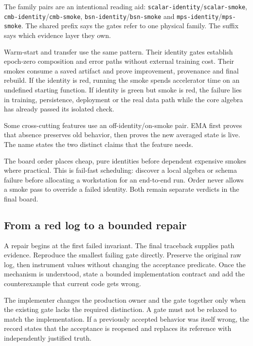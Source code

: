 \documentclass[10pt,aps,prd,twocolumn,nofootinbib]{revtex4-2}
\newcommand{\code}[1]{\texttt{#1}}
\begin{document}
The family pairs are an intentional reading aid:
\code{scalar-identity}/\code{scalar-smoke},
\code{cmb-identity}/\code{cmb-smoke},
\code{bsn-identity}/\code{bsn-smoke} and
\code{mps-identity}/\code{mps-smoke}.  The shared prefix says the gates refer
to one physical family.  The suffix says which evidence layer they own.

Warm-start and transfer use the same pattern.  Their identity gates establish
epoch-zero composition and error paths without external training cost.  Their
smokes consume a saved artifact and prove improvement, provenance and final
rebuild.  If the identity is red, running the smoke spends accelerator time on
an undefined starting function.  If identity is green but smoke is red, the
failure lies in training, persistence, deployment or the real data path
while the core algebra has already passed its isolated check.

Some cross-cutting features use an off-identity/on-smoke pair.  EMA
first proves that absence preserves old behavior, then proves the new averaged
state is live.  The name states the two distinct claims that the feature needs.

The board order places cheap, pure identities before dependent expensive
smokes where practical.  This is fail-fast scheduling: discover a local
algebra or schema failure before allocating a workstation for an end-to-end
run.  Order never allows a smoke pass to override a failed identity.  Both
remain separate verdicts in the final board.

\subsection{From a red log to a bounded repair}

A repair begins at the first failed invariant.  The final traceback supplies
path evidence.  Reproduce the smallest failing gate directly.  Preserve the original raw log,
then instrument values without changing the acceptance predicate.  Once the
mechanism is understood, state a bounded implementation contract and add the
counterexample that current code gets wrong.

The implementer changes the production owner and the gate together only when
the existing gate lacks the required distinction.  A gate must not be relaxed
to match the implementation.  If a previously accepted behavior was itself
wrong, the record states that the acceptance is reopened and replaces its
reference with independently justified truth.
\end{document}
